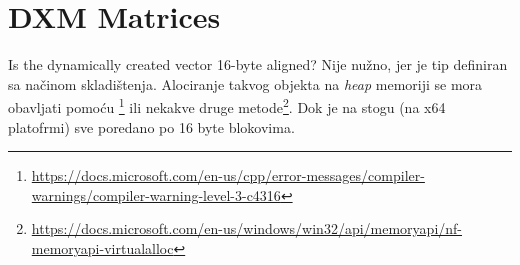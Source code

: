 \begin{codesection}
	
\end{codesection}

\pagebreak

\section{DXM Matrices}
\label{sec:mat}
\setcounter{lstlisting}{0}

\begin{codelisting}
	
\end{codelisting}

\begin{codelisting}
	
\end{codelisting}

\pagebreak

\QandA
{Is the dynamically created vector 16-byte aligned?}
{Nije nužno, jer je tip  definiran sa  načinom skladištenja. Alociranje takvog objekta na \emph{heap} memoriji se mora obavljati pomoću \footnote{\url{https://docs.microsoft.com/en-us/cpp/error-messages/compiler-warnings/compiler-warning-level-3-c4316}} ili nekakve druge metode\footnote{\url{https://docs.microsoft.com/en-us/windows/win32/api/memoryapi/nf-memoryapi-virtualalloc}}. Dok je na stogu (na x64 platofrmi) sve poredano po 16 byte blokovima.}

\begin{codesection}
	
\end{codesection}


\begin{codesection}
	
\end{codesection}

